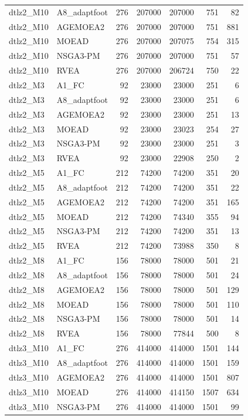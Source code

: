 \begin{tabular}{llrrrrr}
dtlz2_M10 & A8_adaptfoot & 276 & 207000 & 207000 & 751 & 82 \\
dtlz2_M10 & AGEMOEA2 & 276 & 207000 & 207000 & 751 & 881 \\
dtlz2_M10 & MOEAD & 276 & 207000 & 207075 & 754 & 315 \\
dtlz2_M10 & NSGA3-PM & 276 & 207000 & 207000 & 751 & 57 \\
dtlz2_M10 & RVEA & 276 & 207000 & 206724 & 750 & 22 \\
dtlz2_M3 & A1_FC & 92 & 23000 & 23000 & 251 & 6 \\
dtlz2_M3 & A8_adaptfoot & 92 & 23000 & 23000 & 251 & 6 \\
dtlz2_M3 & AGEMOEA2 & 92 & 23000 & 23000 & 251 & 13 \\
dtlz2_M3 & MOEAD & 92 & 23000 & 23023 & 254 & 27 \\
dtlz2_M3 & NSGA3-PM & 92 & 23000 & 23000 & 251 & 3 \\
dtlz2_M3 & RVEA & 92 & 23000 & 22908 & 250 & 2 \\
dtlz2_M5 & A1_FC & 212 & 74200 & 74200 & 351 & 20 \\
dtlz2_M5 & A8_adaptfoot & 212 & 74200 & 74200 & 351 & 22 \\
dtlz2_M5 & AGEMOEA2 & 212 & 74200 & 74200 & 351 & 165 \\
dtlz2_M5 & MOEAD & 212 & 74200 & 74340 & 355 & 94 \\
dtlz2_M5 & NSGA3-PM & 212 & 74200 & 74200 & 351 & 13 \\
dtlz2_M5 & RVEA & 212 & 74200 & 73988 & 350 & 8 \\
dtlz2_M8 & A1_FC & 156 & 78000 & 78000 & 501 & 21 \\
dtlz2_M8 & A8_adaptfoot & 156 & 78000 & 78000 & 501 & 24 \\
dtlz2_M8 & AGEMOEA2 & 156 & 78000 & 78000 & 501 & 129 \\
dtlz2_M8 & MOEAD & 156 & 78000 & 78000 & 501 & 110 \\
dtlz2_M8 & NSGA3-PM & 156 & 78000 & 78000 & 501 & 14 \\
dtlz2_M8 & RVEA & 156 & 78000 & 77844 & 500 & 8 \\
dtlz3_M10 & A1_FC & 276 & 414000 & 414000 & 1501 & 144 \\
dtlz3_M10 & A8_adaptfoot & 276 & 414000 & 414000 & 1501 & 159 \\
dtlz3_M10 & AGEMOEA2 & 276 & 414000 & 414000 & 1501 & 807 \\
dtlz3_M10 & MOEAD & 276 & 414000 & 414150 & 1507 & 634 \\
dtlz3_M10 & NSGA3-PM & 276 & 414000 & 414000 & 1501 & 99 \\

\end{tabular}
